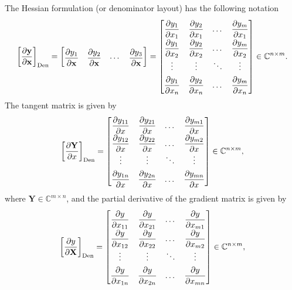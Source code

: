 \documentclass{article}
\begin{document}
The Hessian formulation (or denominator layout) has the following notation
\begin{align}
    \label{eq:denominator-layout}
    \left[ \dfrac{\partial \mathbf{y}}{\partial \mathbf{x}} \right]_{\textnormal{Den}} = \begin{bmatrix}
        \dfrac{\partial y_1}{\partial \mathbf{x}} & \dfrac{\partial y_2}{\partial \mathbf{x}} & \cdots & \dfrac{\partial y_3}{\partial \mathbf{x}}
    \end{bmatrix} = \begin{bmatrix}
        \dfrac{\partial y_1}{\partial x_1} & \dfrac{\partial y_2}{\partial x_1} & \dots & \dfrac{\partial y_m}{\partial x_1} \\
        \dfrac{\partial y_1}{\partial x_2} & \dfrac{\partial y_2}{\partial x_2} & \dots & \dfrac{\partial y_m}{\partial x_2} \\
        \vdots & \vdots & \ddots & \vdots \\
        \dfrac{\partial y_1}{\partial x_n} & \dfrac{\partial y_2}{\partial x_n} & \dots & \dfrac{\partial y_m}{\partial x_n} \\
    \end{bmatrix} \in \mathbb{C}^{n\times m}.
\end{align}
The tangent matrix is given by
\begin{align}
    \left[\dfrac{\partial \mathbf{Y}}{\partial x}\right]_{\textnormal{Den}} \renewcommand{\arraystretch}{1.8} = \begin{bmatrix}
        \dfrac{\partial y_{11}}{\partial x} & \dfrac{\partial y_{21}}{\partial x} & \dots & \dfrac{\partial y_{m1}}{\partial x} \\
        \dfrac{\partial y_{12}}{\partial x} & \dfrac{\partial y_{22}}{\partial x} & \dots & \dfrac{\partial y_{m2}}{\partial x} \\
        \vdots & \vdots & \ddots & \vdots \\
        \dfrac{\partial y_{1n}}{\partial x} & \dfrac{\partial y_{2n}}{\partial x} & \dots & \dfrac{\partial y_{mn}}{\partial x} \\
    \end{bmatrix} \in \mathbb{C}^{n \times m},
\end{align}
where \(\mathbf{Y} \in \mathbb{C}^{m \times n}\), and the partial derivative of the gradient matrix is given by
\begin{align}
    \label{eq:gradient-matrix-den}
    \renewcommand{\arraystretch}{1.8}
			\left[\dfrac{\partial y}{\partial \mathbf{X}}\right]_{\textnormal{Den}} = \begin{bmatrix}
				\dfrac{\partial y}{\partial x_{11}} & \dfrac{\partial y}{\partial x_{21}} & \dots & \dfrac{\partial y}{\partial x_{m1}} \\
				\dfrac{\partial y}{\partial x_{12}} & \dfrac{\partial y}{\partial x_{22}} & \dots & \dfrac{\partial y}{\partial x_{m2}} \\
				\vdots & \vdots & \ddots & \vdots \\
				\dfrac{\partial y}{\partial x_{1n}} & \dfrac{\partial y}{\partial x_{2n}} & \dots & \dfrac{\partial y}{\partial x_{mn}} \\
			\end{bmatrix} \in \mathbb{C}^{n \times m},
\end{align}
\end{document}
